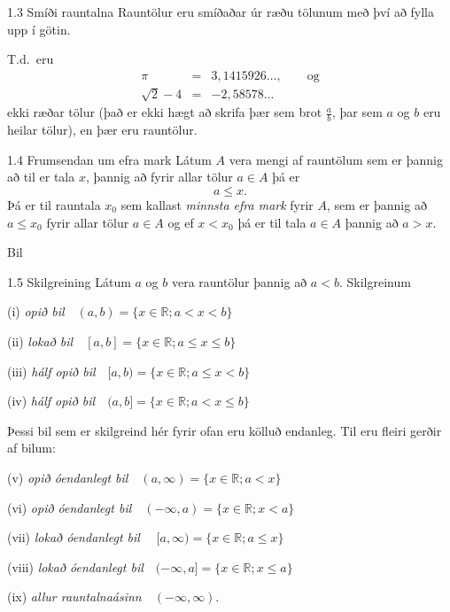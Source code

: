 \documentclass[icelandic,a4paper,12pt]{article}
\newcommand{\R}{{\mathbb  R}}
\begin{document}
\begin{frame}
\begin{block}{1.3 Smíði rauntalna}  Rauntölur eru smíðaðar úr ræðu tölunum
með því að fylla upp í götin. 

\pause

T.d.~eru 
\begin{eqnarray*}
\pi &=& 3,1415926\ldots, \qquad \text{og}\\
\sqrt 2 -4  &=& -2,58578\ldots
\end{eqnarray*}
ekki ræðar tölur (það er ekki hægt að skrifa þær sem brot $\frac ab$, 
þar sem $a$ og $b$ eru heilar tölur), en þær eru rauntölur.
\end{block}

\pause


\begin{block}{1.4 Frumsendan um efra mark}  
Látum $A$ vera mengi af  rauntölum
sem er þannig að til er tala $x$, þannig að 
fyrir allar tölur $a \in A$ þá er 
$$a\leq x.$$ 
Þá er til rauntala $x_0$ sem kallast {\em minnsta efra mark} fyrir
$A$, sem er þannig að  $a\leq x_0$ fyrir allar tölur $a\in
A$ og ef $x<x_0$ þá er til tala $a\in A$ þannig að $a>x$.  
\end{block}
\end{frame}


\begin{frame}{Bil}
\begin{block}{1.5 Skilgreining}  
Látum $a$ og $b$ vera rauntölur þannig að $a<b$.  
Skilgreinum 

(i) {\em opið bil}\ \ $(a,b)=\{x\in \R ; a<x<b\}$

(ii) {\em lokað bil}\ \ $[a,b]=\{x\in \R ; a\leq x\leq b\}$

(iii) {\em hálf opið bil}\ \ $[a,b)=\{x\in \R ; a\leq x<b\}$

(iv) {\em hálf opið bil}\ \ $(a,b]=\{x\in \R ; a< x\leq b\}$

\medskip

Þessi bil sem er skilgreind hér fyrir ofan eru kölluð endanleg.  Til
eru fleiri gerðir af bilum:

(v)  {\em opið óendanlegt bil}\ \    $(a,\infty)=\{x\in \R ; a<x\}$

(vi)  {\em opið óendanlegt bil}\ \    $(-\infty, a)=\{x\in \R ; x<a\}$

(vii)  {\em lokað óendanlegt bil} \ \ $[a,\infty)=\{x\in \R ; a\leq x\}$

(viii)  {\em lokað óendanlegt bil}\ \  $(-\infty, a]=\{x\in \R ; x\leq a\}$

(ix)  {\em allur rauntalnaásinn}\ \  $(-\infty, \infty)$.
\end{block}
\end{frame}
\end{document}
